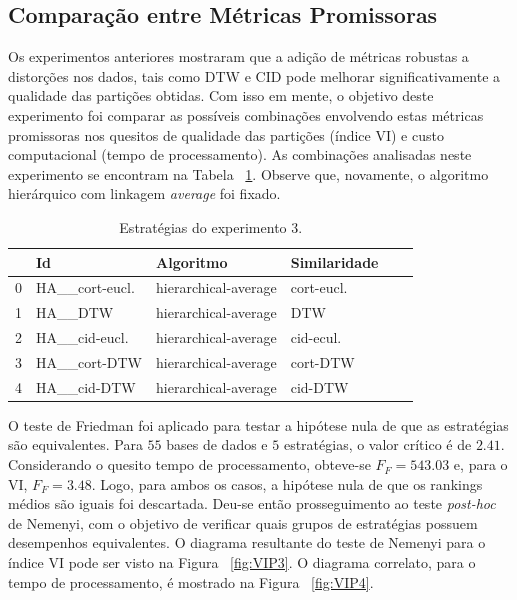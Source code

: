 \subsection{Comparação entre Métricas Promissoras} \label{exp:3}

Os experimentos anteriores mostraram que a adição de métricas 
robustas a distorções nos dados, tais como DTW e CID pode melhorar
significativamente a qualidade das partições obtidas. Com isso em mente, 
o objetivo deste experimento foi comparar as possíveis combinações 
envolvendo estas métricas promissoras nos quesitos de qualidade das 
partições (índice VI) e custo computacional (tempo de processamento). 
As combinações analisadas neste experimento se encontram na Tabela ~\ref{tbl:3}. 
Observe que, novamente, o algoritmo hierárquico com linkagem \emph{average} foi 
fixado.

	
	\begin{table}
		\centering		
	\begin{tabular}{llllll}
		\toprule
		{} &              Id &             Algoritmo & Similaridade \\
		\midrule
		0 &  HA\_\_cort-eucl. &  hierarchical-average & cort-eucl. \\
		1 &         HA\_\_DTW &  hierarchical-average &  DTW \\
		2 &   HA\_\_cid-eucl. &  hierarchical-average &  cid-ecul. \\
		3 &    HA\_\_cort-DTW &  hierarchical-average &  cort-DTW \\
		4 &     HA\_\_cid-DTW &  hierarchical-average &   cid-DTW \\
		\bottomrule
	\end{tabular}
	\caption{Estratégias do experimento 3.}  \label{tbl:3}
		\end{table}

O teste de Friedman foi aplicado para testar a hipótese nula de que as estratégias 
são equivalentes. Para $55$ bases de dados e $5$ estratégias, o valor crítico 
é de $2.41$. Considerando o quesito tempo de processamento, 
obteve-se $F_F=543.03$ e, para o VI, $F_F=3.48$. Logo, 
para ambos os casos, a hipótese nula de que os rankings médios são iguais 
foi descartada. Deu-se então prosseguimento ao teste \emph{post-hoc} de Nemenyi, 
com o objetivo de verificar quais grupos de estratégias possuem desempenhos 
equivalentes. O diagrama resultante do teste de Nemenyi para o índice VI pode ser 
visto na Figura ~\ref{fig:VIP3}. O diagrama correlato, para o 
tempo de processamento, é mostrado na Figura ~\ref{fig:VIP4}. 

